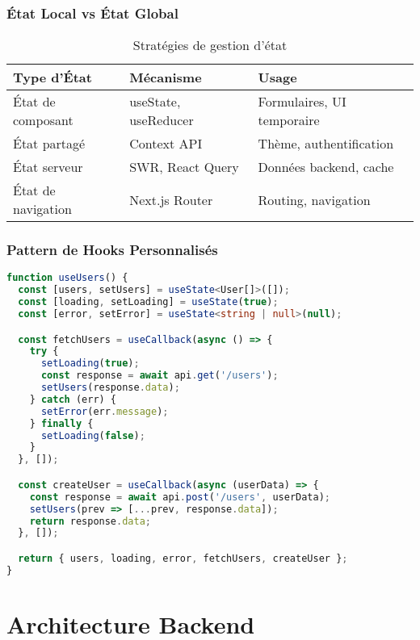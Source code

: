 \subsubsection{État Local vs État Global}

\begin{table}[H]
    \centering
    \begin{tabularx}{\textwidth}{|X|X|X|}
        \hline
        \textbf{Type d'État} & \textbf{Mécanisme} & \textbf{Usage} \\
        \hline
        État de composant & useState, useReducer & Formulaires, UI temporaire \\
        \hline
        État partagé & Context API & Thème, authentification \\
        \hline
        État serveur & SWR, React Query & Données backend, cache \\
        \hline
        État de navigation & Next.js Router & Routing, navigation \\
        \hline
    \end{tabularx}
    \caption{Stratégies de gestion d'état}
    \label{tab:state_management}
\end{table}

\subsubsection{Pattern de Hooks Personnalisés}

\begin{lstlisting}[language=TypeScript, caption=Hook personnalisé pour la gestion des utilisateurs]
function useUsers() {
  const [users, setUsers] = useState<User[]>([]);
  const [loading, setLoading] = useState(true);
  const [error, setError] = useState<string | null>(null);

  const fetchUsers = useCallback(async () => {
    try {
      setLoading(true);
      const response = await api.get('/users');
      setUsers(response.data);
    } catch (err) {
      setError(err.message);
    } finally {
      setLoading(false);
    }
  }, []);

  const createUser = useCallback(async (userData) => {
    const response = await api.post('/users', userData);
    setUsers(prev => [...prev, response.data]);
    return response.data;
  }, []);

  return { users, loading, error, fetchUsers, createUser };
}
\end{lstlisting}

\section{Architecture Backend}

